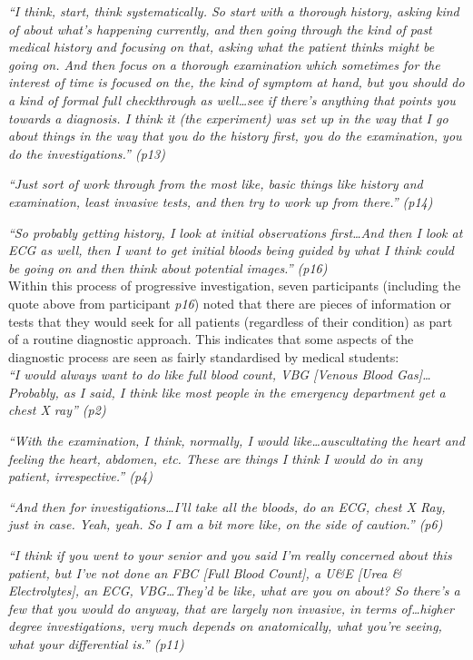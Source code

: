 \documentclass[a4paper, nobind]{templates/ociamthesis}
\begin{document}
\emph{``I think, start, think systematically. So start with a thorough history, asking kind of about what's happening currently, and then going through the kind of past medical history and focusing on that, asking what the patient thinks might be going on. And then focus on a thorough examination which sometimes for the interest of time is focused on the, the kind of symptom at hand, but you should do a kind of formal full checkthrough as well\ldots see if there's anything that points you towards a diagnosis. I think it (the experiment) was set up in the way that I go about things in the way that you do the history first, you do the examination, you do the investigations.'' (p13)}

\emph{``Just sort of work through from the most like, basic things like history and examination, least invasive tests, and then try to work up from there.'' (p14)}

\emph{``So probably getting history, I look at initial observations first\ldots And then I look at ECG as well, then I want to get initial bloods being guided by what I think could be going on and then think about potential images.'' (p16)}\\

Within this process of progressive investigation, seven participants (including the quote above from participant \emph{p16}) noted that there are pieces of information or tests that they would seek for all patients (regardless of their condition) as part of a routine diagnostic approach. This indicates that some aspects of the diagnostic process are seen as fairly standardised by medical students:\\

\emph{``I would always want to do like full blood count, VBG {[}Venous Blood Gas{]}\ldots{} Probably, as I said, I think like most people in the emergency department get a chest X ray'' (p2)}

\emph{``With the examination, I think, normally, I would like\ldots auscultating the heart and feeling the heart, abdomen, etc. These are things I think I would do in any patient, irrespective.'' (p4)}

\emph{``And then for investigations\ldots I'll take all the bloods, do an ECG, chest X Ray, just in case. Yeah, yeah. So I am a bit more like, on the side of caution.'' (p6)}

\emph{``I think if you went to your senior and you said I'm really concerned about this patient, but I've not done an FBC {[}Full Blood Count{]}, a U\&E {[}Urea \& Electrolytes{]}, an ECG, VBG\ldots They'd be like, what are you on about? So there's a few that you would do anyway, that are largely non invasive, in terms of\ldots higher degree investigations, very much depends on anatomically, what you're seeing, what your differential is.'' (p11)}
\end{document}
